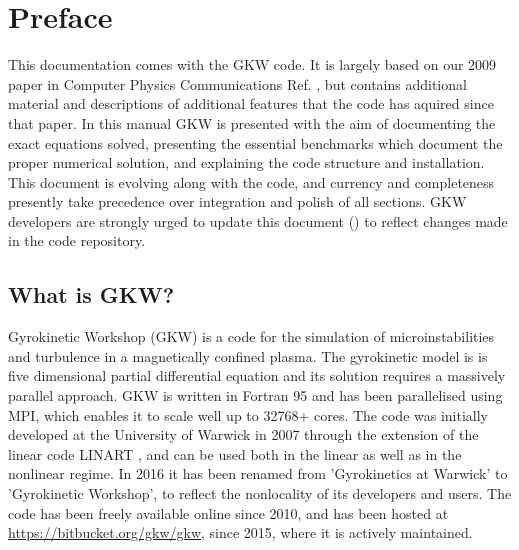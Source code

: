 \chapter*{Preface}

This documentation comes with the GKW code. It is largely based on our 2009 paper in Computer Physics Communications Ref. \cite{CPC-paper},
but contains additional material and descriptions of additional features that the code has aquired since that paper.
In this manual GKW is presented 
with the aim of documenting the exact equations solved, presenting the essential benchmarks which 
document the proper numerical solution, and explaining the code structure and installation.  
This document is evolving along with the code, and 
currency and completeness presently take precedence over integration and polish of all sections.  
GKW developers are strongly urged to update this document () to reflect changes made in the code repository.


\section*{What is GKW?}

Gyrokinetic Workshop (GKW) is a code for the simulation of microinstabilities and turbulence in a magnetically confined plasma.
The gyrokinetic model is is five dimensional partial differential equation and its solution requires a massively parallel approach. 
GKW is written in Fortran 95 and has been parallelised using MPI, which enables it to scale well up to 32768+ cores.
The code was initially developed at the University of Warwick in 2007 through the extension of the linear code
LINART \cite{PEE04}, and can be used both in the linear as well as in the nonlinear regime. In 2016 it has been renamed from 'Gyrokinetics at Warwick' to 'Gyrokinetic Workshop', to reflect the nonlocality of its developers and users.
The code has been freely available online since 2010,
and has been hosted at \href{https://bitbucket.org/gkw/gkw}{https://bitbucket.org/gkw/gkw},
since 2015, where it is actively maintained.


